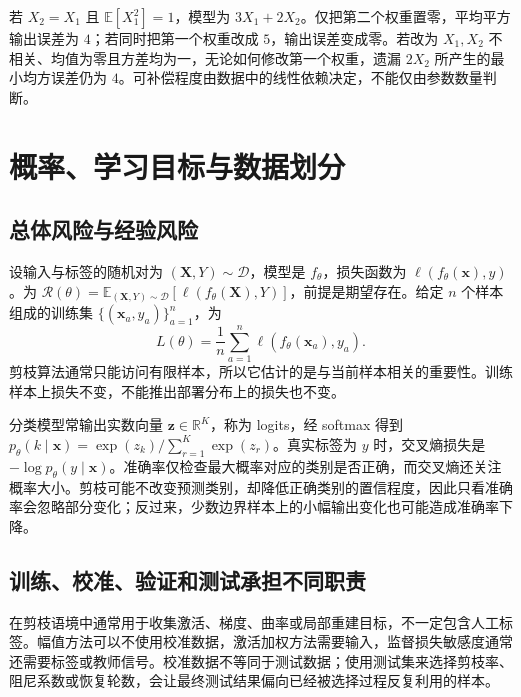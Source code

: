 \documentclass[UTF8,12pt,a4paper,fontset=fandol]{ctexart}
\begin{document}
\begin{example}[相关特征允许补偿]
若 $X_2=X_1$ 且 $\mathbb E[X_1^2]=1$，模型为 $3X_1+2X_2$。仅把第二个权重置零，平均平方输出误差为 $4$；若同时把第一个权重改成 $5$，输出误差变成零。若改为 $X_1,X_2$ 不相关、均值为零且方差均为一，无论如何修改第一个权重，遗漏 $2X_2$ 所产生的最小均方误差仍为 $4$。可补偿程度由数据中的线性依赖决定，不能仅由参数数量判断。
\end{example}

\section{概率、学习目标与数据划分}
\label{sec:prune-learning}

\subsection{总体风险与经验风险}
设输入与标签的随机对为 $(\mathbf X,Y)\sim\mathcal D$，模型是 $f_\theta$，损失函数为 $\ell(f_\theta(\mathbf x),y)$。为 $\mathcal R(\theta)=\mathbb E_{(\mathbf X,Y)\sim\mathcal D}[\ell(f_\theta(\mathbf X),Y)]$，前提是期望存在。给定 $n$ 个样本组成的训练集 $\{(\mathbf x_a,y_a)\}_{a=1}^n$，为
\begin{equation}
 L(\theta)=\frac1n\sum_{a=1}^n\ell(f_\theta(\mathbf x_a),y_a).
 \label{eq:prune-empirical}
\end{equation}
剪枝算法通常只能访问有限样本，所以它估计的是与当前样本相关的重要性。训练样本上损失不变，不能推出部署分布上的损失也不变。

分类模型常输出实数向量 $\mathbf z\in\mathbb R^K$，称为 logits，经 softmax 得到 $p_\theta(k\mid\mathbf x)=\exp(z_k)/\sum_{r=1}^K\exp(z_r)$。真实标签为 $y$ 时，交叉熵损失是 $-\log p_\theta(y\mid\mathbf x)$。准确率仅检查最大概率对应的类别是否正确，而交叉熵还关注概率大小。剪枝可能不改变预测类别，却降低正确类别的置信程度，因此只看准确率会忽略部分变化；反过来，少数边界样本上的小幅输出变化也可能造成准确率下降。

\subsection{训练、校准、验证和测试承担不同职责}
在剪枝语境中通常用于收集激活、梯度、曲率或局部重建目标，不一定包含人工标签。幅值方法可以不使用校准数据，激活加权方法需要输入，监督损失敏感度通常还需要标签或教师信号。校准数据不等同于测试数据；使用测试集来选择剪枝率、阻尼系数或恢复轮数，会让最终测试结果偏向已经被选择过程反复利用的样本。
\end{document}
